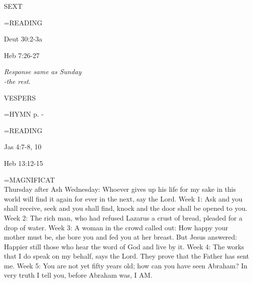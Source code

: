 \begin{flushleft}\normalsize SEXT\\\end{flushleft}

\hangindent=\parindent \small READING
\begin{description}[labelindent=\parindent, leftmargin=*]
\item [Thursday after Ash Wednesday \& Weeks 1-4:]     Deut 30:2-3a \textbf{    \\}
\item [Week 5:]     Heb 7:26-27 \textbf{    \\}
\end{description}

\begin{center}
\textit{Response same as Sunday\\
-the rest.}
\end{center}

\begin{flushleft}\normalsize VESPERS\\\end{flushleft}

\hangindent=\parindent \small{\uppercase{HYMN} p. \pageref{lent:firstHymn}-\pageref{lent:lastHymn}\\}

\hangindent=\parindent \small READING
\begin{description}[labelindent=\parindent, leftmargin=*]
\item [Thursday after Ash Wednesday \& Weeks 1-4:]     Jas 4:7-8, 10 \textbf{    \\}
\item [Week 5:]     Heb 13:12-15 \textbf{    \\}
\end{description}

\hangindent=\parindent \small{MAGNIFICAT \\}
Thursday after Ash Wednesday:	Whoever gives up his life for my sake in this world will find it again for ever in the next, say the Lord.
Week 1:	Ask and you shall receive, seek and you shall find, knock and the door shall be opened to you.
Week 2:	The rich man, who had refused Lazarus a crust of bread, pleaded for a drop of water.
Week 3:	A woman in the crowd called out: How happy your mother must be, she bore you and fed you at her breast. But Jesus answered: Happier still those who hear the word of God and live by it.
Week 4:	The works that I do speak on my behalf, says the Lord. They prove that the Father has sent me.
Week 5:	You are not yet fifty years old; how can you have seen Abraham? In very truth I tell you, before Abraham was, I AM.
